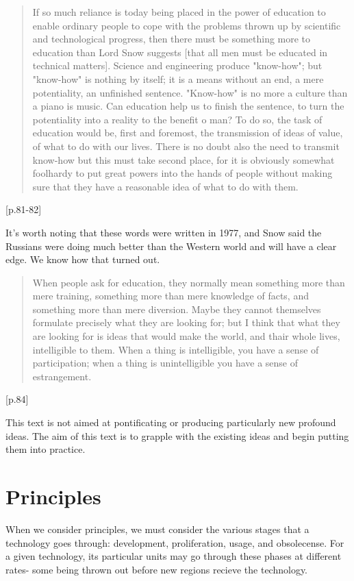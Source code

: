 \documentclass[10pt,letterpaper,openany]{book}
\begin{document}
\begin{quote}
If so much reliance is today being placed in the power of education to enable ordinary people to cope with the problems thrown up by scientific and technological progress, then there must be something more to education than Lord Snow suggests [that all men must be educated in technical matters]. Science and engineering produce "know-how"; but "know-how" is nothing by itself; it is a means without an end, a mere potentiality, an unfinished sentence. "Know-how" is no more a culture than a piano is music. Can education help us to finish the sentence, to turn the potentiality into a reality to the benefit o man? To do so, the task of education would be, first and foremost, the transmission of ideas of value, of what to do with our lives. There is no doubt also the need to transmit know-how but this must take second place, for it is obviously somewhat foolhardy to put great powers into the hands of people without making sure that they have a reasonable idea of what to do with them.
\end{quote}[p.81-82]

It's worth noting that these words were written in 1977, and Snow said the Russians were doing much better than the Western world and will have a clear edge. We know how that turned out.

\begin{quote}
When people ask for education, they normally mean something more than mere training, something more than mere knowledge of facts, and something more than mere diversion. Maybe they cannot themselves formulate precisely what they are looking for; but I think that what they are looking for is ideas that would make the world, and thair whole lives, intelligible to them. When a thing is intelligible, you have a sense of participation; when a thing is unintelligible you have a sense of estrangement.
\end{quote}[p.84]

This text is not aimed at pontificating or producing particularly new profound ideas. The aim of this text is to grapple with the existing ideas and begin putting them into practice.

\section{Principles}

When we consider principles, we must consider the various stages that a technology goes through: development, proliferation, usage, and obsolecense. For a given technology, its particular units may go through these phases at different rates- some being thrown out before new regions recieve the technology.
\end{document}
